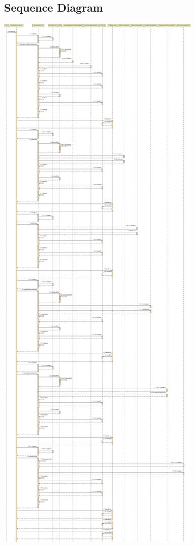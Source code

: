 \subsection{Sequence Diagram}
\includegraphics[width=0.5\columnwidth]{images/RestDispatcherServlet_processUser.jpg}